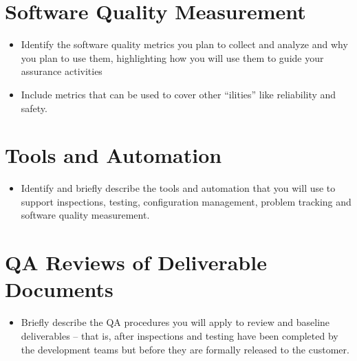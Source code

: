 \documentclass[11pt]{wacomepd}
\begin{document}
\chapter{Software Quality Measurement}
\begin{itemize}
\item Identify the software quality metrics you plan to collect and analyze and why you plan to use
  them, highlighting how you will use them to guide your assurance activities
\item Include metrics that can be used to cover other “ilities” like reliability and safety.
\end{itemize}





\chapter{Tools and Automation}
\begin{itemize}
\item Identify and briefly describe the tools and automation that you will use to support
  inspections, testing, configuration management, problem tracking and software quality measurement.
\end{itemize}



\chapter{QA Reviews of Deliverable Documents}
\begin{itemize}
\item Briefly describe the QA procedures you will apply to review and baseline deliverables – that
  is, after inspections and testing have been completed by the development teams but before they are
  formally released to the customer.
\end{itemize}



\end{document}
